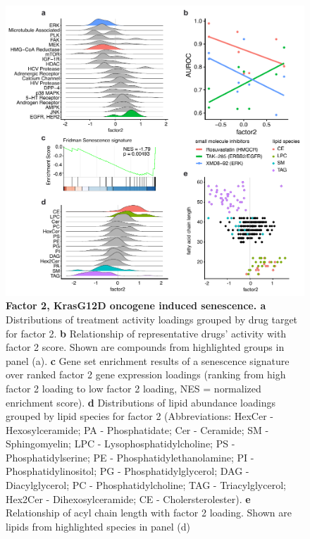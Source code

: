 \begin{flushleft}
\begin{figure}[h!]
\centering
\includegraphics[scale=0.75,
                keepaspectratio]{figures/adenomaprofiling/pdf/fig_3_1.pdf}
\caption{\textbf{Factor 2, KrasG12D oncogene induced senescence. a} Distributions of treatment activity loadings grouped by drug target for factor 2. \textbf{b} Relationship of representative drugs’ activity with factor 2 score. Shown are compounds from highlighted groups in panel (a). \textbf{c} Gene set enrichment results of a senescence signature \cite{Fridman2008-ky} over ranked factor 2 gene expression loadings (ranking from high factor 2 loading to low factor 2 loading, NES = normalized enrichment score). \textbf{d} Distributions of lipid abundance loadings grouped by lipid species for factor 2 (Abbreviations: HexCer - Hexosylceramide; PA - Phosphatidate; Cer - Ceramide; SM - Sphingomyelin; LPC - Lysophosphatidylcholine; PS - Phosphatidylserine; PE - Phosphatidylethanolamine; PI - Phosphatidylinositol; PG - Phosphatidylglycerol; DAG - Diacylglycerol; PC - Phosphatidylcholine; TAG - Triacylglycerol; Hex2Cer - Dihexosylceramide; CE - Cholersterolester). \textbf{e} Relationship of acyl chain length with factor 2 loading. Shown are lipids from highlighted species in panel (d)}
\label{fig_200}
\end{figure}


\end{flushleft}
